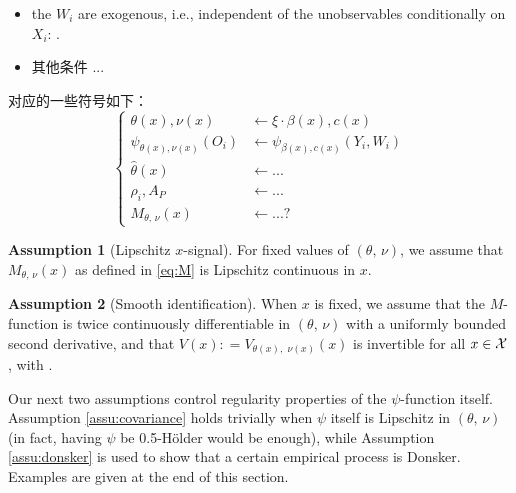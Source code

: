 \documentclass[aos]{imsart}
\theoremstyle{plain}
\theoremstyle{definition}
\newtheorem{assu}{Assumption}
\theoremstyle{remark}
\begin{document}
\begin{CJK}{UTF8}{gbsn}
\begin{itemize}
    \item the $W_i$ are exogenous, i.e., independent of the unobservables conditionally on $X_i$: . 
    \item 其他条件 ...
\end{itemize}

对应的一些符号如下：
$$
\begin{cases}
\theta(x), \nu(x) &\leftarrow  \xi \cdot \beta(x), c(x)\\
\psi_{\theta(x), \nu(x)}(O_i) &\leftarrow \psi_{\beta(x), c(x)}(Y_i, W_i) \\
\hat{\theta}(x) &\leftarrow ... \\
\rho_i, A_P  &\leftarrow ... \\
M_{\theta, \, \nu}(x)  &\leftarrow ... ?
\end{cases}
$$

\begin{assu}[Lipschitz $x$-signal]
\label{assu:lip}
For fixed values of $(\theta, \, \nu)$, we assume that $M_{\theta, \, \nu}(x)$ 
as defined in \eqref{eq:M} is Lipschitz continuous in $x$.
\end{assu}

\begin{assu}[Smooth identification]
\label{assu:identification}
When $x$ is fixed, we assume that the $M$-function is twice continuously differentiable
in $(\theta, \, \nu)$ with a uniformly bounded second derivative, and
that $V(x): = V_{\theta(x), \, \, \nu(x)}(x)$ is invertible for all $x \in \mathcal{X}$, with
.
\end{assu}

Our next two assumptions control regularity properties of the $\psi$-function itself.
Assumption \ref{assu:covariance} holds trivially when $\psi$ itself is
Lipschitz in $(\theta, \, \nu)$ (in fact, having $\psi$ be 0.5-H{\"o}lder would be enough),
while Assumption \ref{assu:donsker} is used to show that a certain empirical process is
Donsker. Examples are given at the end of this section.


\end{CJK}
\end{document}
